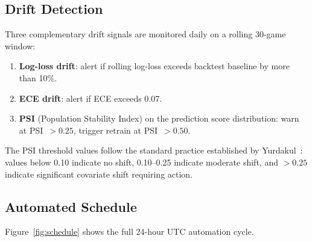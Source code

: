 \documentclass[conference]{IEEEtran}
\begin{document}
\subsection{Drift Detection}
\label{subsec:drift}

Three complementary drift signals are monitored daily on a rolling
30-game window:

\begin{enumerate}
  \item \textbf{Log-loss drift}: alert if rolling log-loss exceeds
        backtest baseline by more than 10\%.
  \item \textbf{ECE drift}: alert if ECE exceeds 0.07.
  \item \textbf{PSI} (Population Stability Index) on the prediction
        score distribution: warn at PSI~$> 0.25$, trigger retrain at
        PSI~$> 0.50$.
\end{enumerate}

The PSI threshold values follow the standard practice established by
Yurdakul~\cite{yurdakul2018}: values below 0.10 indicate no shift,
0.10--0.25 indicate moderate shift, and $> 0.25$ indicate significant
covariate shift requiring action.

\subsection{Automated Schedule}

Figure~\ref{fig:schedule} shows the full 24-hour UTC automation cycle.
\end{document}
